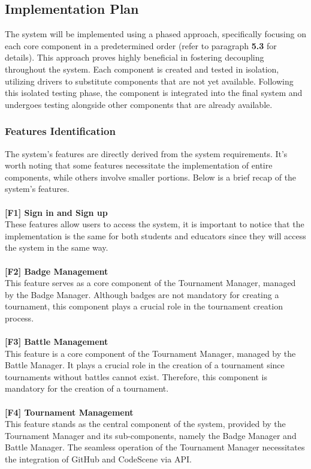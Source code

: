 \documentclass{article}
\begin{document}
\subsection{Implementation Plan}
The system will be implemented using a phased approach, specifically focusing on each core component in a predetermined order (refer to paragraph \textbf{5.3} for details). This approach proves highly beneficial in fostering decoupling throughout the system. Each component is created and tested in isolation, utilizing drivers to substitute components that are not yet available. Following this isolated testing phase, the component is integrated into the final system and undergoes testing alongside other components that are already available.
\subsubsection{Features Identification}
The system's features are directly derived from the system requirements. It's worth noting that some features necessitate the implementation of entire components, while others involve smaller portions. Below is a brief recap of the system's features. \\\\
\textbf{[F1] Sign in and Sign up} \\
These features allow users to access the system, it is important to notice that the implementation is the same for both students and educators since they will access the system in the same way. \\\\
\textbf{[F2] Badge Management} \\
This feature serves as a core component of the Tournament Manager, managed by the Badge Manager. Although badges are not mandatory for creating a tournament, this component plays a crucial role in the tournament creation process. \\\\
\textbf{[F3] Battle Management} \\
This feature is a core component of the Tournament Manager, managed by the Battle Manager. It plays a crucial role in the creation of a tournament since tournaments without battles cannot exist. Therefore, this component is mandatory for the creation of a tournament. \\\\
\textbf{[F4] Tournament Management} \\
This feature stands as the central component of the system, provided by the Tournament Manager and its sub-components, namely the Badge Manager and Battle Manager. The seamless operation of the Tournament Manager necessitates the integration of GitHub and CodeScene via API. \\\\
\end{document}
